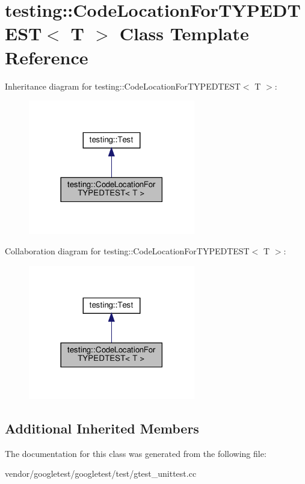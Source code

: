 \hypertarget{classtesting_1_1_code_location_for_t_y_p_e_d_t_e_s_t}{}\section{testing\+:\+:Code\+Location\+For\+T\+Y\+P\+E\+D\+T\+E\+ST$<$ T $>$ Class Template Reference}
\label{classtesting_1_1_code_location_for_t_y_p_e_d_t_e_s_t}


Inheritance diagram for testing\+:\+:Code\+Location\+For\+T\+Y\+P\+E\+D\+T\+E\+ST$<$ T $>$\+:
\nopagebreak
\begin{figure}[H]
\begin{center}
\leavevmode
\includegraphics[width=206pt]{classtesting_1_1_code_location_for_t_y_p_e_d_t_e_s_t__inherit__graph}
\end{center}
\end{figure}


Collaboration diagram for testing\+:\+:Code\+Location\+For\+T\+Y\+P\+E\+D\+T\+E\+ST$<$ T $>$\+:
\nopagebreak
\begin{figure}[H]
\begin{center}
\leavevmode
\includegraphics[width=206pt]{classtesting_1_1_code_location_for_t_y_p_e_d_t_e_s_t__coll__graph}
\end{center}
\end{figure}
\subsection*{Additional Inherited Members}


The documentation for this class was generated from the following file\+:\begin{DoxyCompactItemize}
\item 
vendor/googletest/googletest/test/gtest\+\_\+unittest.\+cc\end{DoxyCompactItemize}
